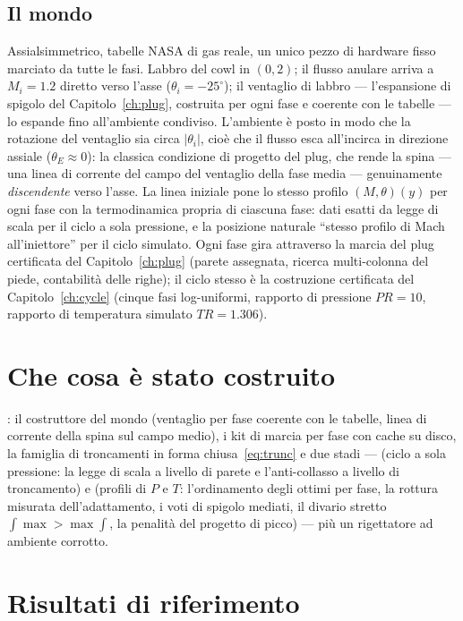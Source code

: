 \subsection{Il mondo}

Assialsimmetrico, tabelle NASA di gas reale, un unico pezzo di
hardware fisso marciato da tutte le fasi. Labbro del cowl in
$(0, 2)$; il flusso anulare arriva a $M_i = 1.2$ diretto verso
l'asse ($\theta_i = -25^{\circ}$); il ventaglio di labbro ---
l'espansione di spigolo del Capitolo~\ref{ch:plug}, costruita per
ogni fase e coerente con le tabelle --- lo espande fino all'ambiente
condiviso. L'ambiente è posto in modo che la rotazione del ventaglio
sia circa $|\theta_i|$, cioè che il flusso esca all'incirca in
direzione assiale ($\theta_E \approx 0$): la classica condizione di
progetto del plug, che rende la spina --- una linea di corrente del
campo del ventaglio della fase media --- genuinamente
\emph{discendente} verso l'asse. La linea iniziale pone lo stesso
profilo $(M,\theta)(y)$ per ogni fase con la termodinamica propria
di ciascuna fase: dati esatti da legge di scala per il ciclo a sola
pressione, e la posizione naturale ``stesso profilo di Mach
all'iniettore'' per il ciclo simulato. Ogni fase gira attraverso la
marcia del plug certificata del Capitolo~\ref{ch:plug} (parete
assegnata, ricerca multi-colonna del piede, contabilità delle
righe); il ciclo stesso è la costruzione certificata del
Capitolo~\ref{ch:cycle} (cinque fasi log-uniformi, rapporto di
pressione $PR = 10$, rapporto di temperatura simulato
$TR = 1.306$).

\section{Che cosa è stato costruito}

: il costruttore del mondo
(ventaglio per fase coerente con le tabelle, linea di corrente della
spina sul campo medio), i kit di marcia per fase con cache su disco,
la famiglia di troncamenti in forma chiusa~\eqref{eq:trunc} e due
stadi ---  (ciclo a sola pressione: la legge di scala a
livello di parete e l'anti-collasso a livello di troncamento) e
 (profili di $P$ e $T$: l'ordinamento degli ottimi per
fase, la rottura misurata dell'adattamento, i voti di spigolo
mediati, il divario stretto $\int\max > \max\int$, la penalità del
progetto di picco) --- più un rigettatore ad ambiente corrotto.

\section{Risultati di riferimento}

